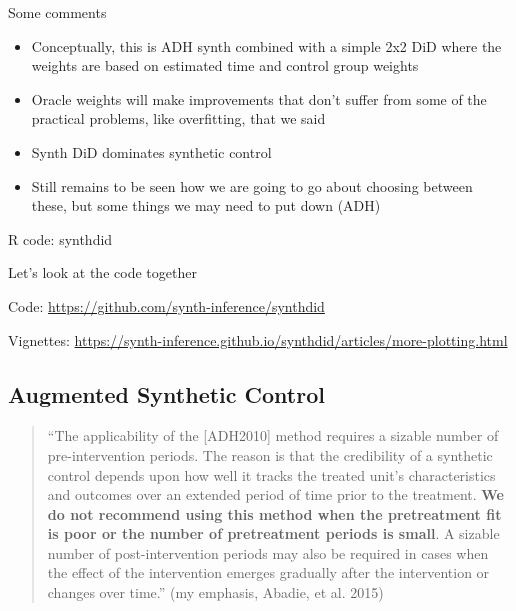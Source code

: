 \documentclass{beamer}
\begin{document}
\begin{frame}{Some comments}

\begin{itemize}
\item Conceptually, this is ADH synth combined with a simple 2x2 DiD where the weights are based on estimated time and control group weights
\item Oracle weights will make improvements that don't suffer from some of the practical problems, like overfitting, that we said
\item Synth DiD dominates synthetic control
\item Still remains to be seen how we are going to go about choosing between these, but some things we may need to put down (ADH)
\end{itemize}

\end{frame}

\begin{frame}{R code: synthdid}

Let's look at the code together

\bigskip

Code: \url{https://github.com/synth-inference/synthdid} 

\bigskip

Vignettes: \url{https://synth-inference.github.io/synthdid/articles/more-plotting.html}

\end{frame}





\subsection{Augmented Synthetic Control}


\begin{frame}

\begin{quote}
``The applicability of the [ADH2010] method requires a sizable number of pre-intervention periods. The reason is that the credibility of a synthetic control depends upon how well it tracks the treated unit’s characteristics and outcomes over an extended period of time prior to the treatment. \textbf{We do not recommend using this method when the pretreatment fit is poor or the number of pretreatment periods is small}. A sizable number of post-intervention periods may also be required in cases when the effect of the intervention emerges gradually after the intervention or changes over time.'' (my emphasis, Abadie, et al. 2015)
\end{quote}

\end{frame}
\end{document}
